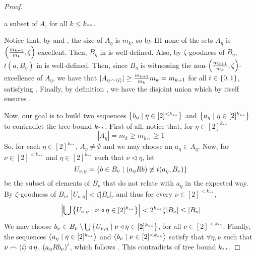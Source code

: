 \begin{lemma}[Claim 5.4.1]
\begin{proof}
\begin{enumerate}
                    a subset of $A$, for all $k \leq k_{**}$.
            \end{enumerate}
            Notice that, by  and
            , the size of $A_\eta$ is $m_k$,
            so by IH none of the sets $A_\eta$ is $\left( \frac{m_{k+1}}{m_{k}}, \zeta \right)$-excellent.
            Then, $B_\eta$ in  is well-defined.
            Also, by $\zeta$-goodness of $B_\eta$, $t(a, B_\eta)$ in  is well-defined.
            Then, since $B_\eta$ is witnessing the non-$\left( \frac{m_{k+1}}{m_{k}}, \zeta \right)$-excellence of $A_\eta$,
            we have that $|A_{\eta \frown \left< i \right>}| \geq \frac{m_{k+1}}{m_k} m_{k} = m_{k+1}$ for all
            $i \in \left\{ 0,1 \right\}$, satisfying .
            Finally, by definition , we have the disjoint union
             which by itself
            ensures .

            Now, our goal is to build two sequences $\left\{ b_\eta \mid \eta \in [2]^{<k_{**}} \right\}$ and
            $\left\{ a_\eta \mid \eta \in [2]^{k_{**}} \right\}$ to contradict the tree bound $k_{**}$.
            First of all, notice that, for $\eta \in [2]^{k_{**}}$
            \[
                |A_\eta| = m_k \geq m_{k_{**}} \geq 1
            \]
            So, for each $\eta \in [2]^{k_{**}}$, $A_\eta \neq \emptyset$ and we may choose an $a_\eta \in A_\eta$.
            Now, for $\nu \in [2]^{<k_{**}}$ and $\eta \in [2]^{k_{**}}$ such that $\nu \triangleleft \eta$, let
            \[
                U_{\nu,\eta} = \left\{ b \in B_\nu \mid (a_\eta R b) \not\equiv t(a_\eta, B_\nu) \right\}
            \]
            be the subset of elements of $B_\nu$ that do not relate with $a_\eta$ in the expected way.
            By $\zeta$-goodness of $B_\nu$, $|U_{\nu, \eta}| < \zeta |B_\nu|$, and thus for every $\nu \in [2]^{<k_{**}}$,
            \[
                \left| \bigcup\left\{  U_{\nu,\eta} \mid \nu \triangleleft \eta \in [2]^{k_{**}} \right\} \right| <
                2^{k_{**}} \zeta |B_\nu| \leq |B_\nu|
            \]
            We may choose $b_\nu \in B_\nu \setminus \bigcup\left\{ U_{\nu,\eta} \mid \nu \triangleleft \eta \in [2]^{k_{**}} \right\}$,
            for all $\nu \in [2]^{<k_{**}}$.
            Finally, the sequences $\left< a_\eta \mid \eta \in [2]^{k_{**}} \right>$ and
            $\left< b_\nu \mid \nu \in [2]^{<k_{**}} \right>$ satisfy that $\forall \eta, \nu$ such that
            $\nu \frown \left< i \right> \triangleleft \eta$, $\left( a_\eta R b_\nu \right)^i$, which follows
            .
            This contradicts  of tree bound $k_{**}$.
        \end{proof}
    \end{lemma}


